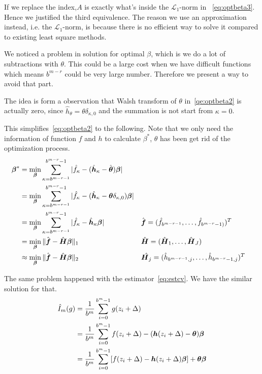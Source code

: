 If we replace the index,$A$ is exactly what's inside the $\mathcal{L}_1$-norm in ~\eqref{eq:optbeta3}. 
Hence we justified the third equivalence. The reason we use an approximation instead, i.e. the $\mathcal{L}_1$-norm, is because there is no efficient way to solve it compared to existing least square methods.


We noticed a problem in solution for optimal $\beta$, which is we do a lot of subtractions with $\theta$. This could be a large cost when we have difficult functions which means $b^{m-r}$ could be very large number. Therefore we present a way to avoid that part.

The idea is form a observation that Walsh transform of $\theta$ in~\eqref{qe:optbeta2} is actually zero, since $\hat{h}_\theta= \theta\delta_{\kappa,0}$ and the summation is not start from $\kappa=0$.

This simplifies~\eqref{eq:optbeta2} to the following. Note that we only need the information of function $f$ and $h$ to calculate $\beta^*$, $\theta$ has been get rid of the optimization process.
\begin{align}
    \boldsymbol{\beta}^*
    \label{eq:optbetanew}
    &=\min_{\boldsymbol{\beta}}\sum_{\kappa=b^{m-r-1}}^{b^{m-r}-1}|\hat{f}_\kappa
    -(\hat{\boldsymbol{h}}_\kappa - \hat{\boldsymbol{\theta}})\boldsymbol{\boldsymbol{\beta}}|\\
    &=\min_{\boldsymbol{\beta}}\sum_{\kappa=b^{m-r-1}}^{b^{m-r}-1}|\hat{f}_\kappa
    -(\hat{\boldsymbol{h}}_\kappa - \boldsymbol{\theta}\delta_{\kappa,0})\boldsymbol{\boldsymbol{\beta}}| \notag \\
    &=\min_{\boldsymbol{\beta}}\sum_{\kappa=b^{m-r-1}}^{b^{m-r}-1}|\hat{f}_\kappa
    -\hat{\boldsymbol{h}}_\kappa \boldsymbol{\boldsymbol{\beta}}|
    && \hat{\boldsymbol{f}}= (\hat{f}_{b^{m-r-1}},\dots,\hat{f}_{b^{m-r}-1)})^T \notag\\
    &=\min_{\boldsymbol{\beta}}\|\hat{\boldsymbol{f}}-\hat{\boldsymbol{H}}\boldsymbol{\beta}\|_1
    && \hat{\boldsymbol{H}}= (\hat{\boldsymbol{H}}_1, \dots, \hat{\boldsymbol{H}}_J)\notag \\
    &\approx\min_{\boldsymbol{\beta}}\|\hat{\boldsymbol{f}}-\hat{\boldsymbol{H}}\boldsymbol{\beta}\|_2
    &&\hat{\boldsymbol{H}_j}=(\hat{h}_{b^{m-r-1},j},\dots, \hat{h}_{b^{m-r}-1,j})^T \notag
\end{align}

The same problem happened with the estimator~\eqref{eq:estcv}. We have the similar solution for that.
\begin{align}
    \notag
    \hat{I}_m({g})
    & = \frac{1}{b^m}\sum_{i=0}^{b^m-1}g(z_i+\Delta)\\
    \notag
    & = \frac{1}{b^m}\sum_{i=0}^{b^m-1}f(z_i+\Delta)-(\boldsymbol{h}(z_i+\Delta)-\boldsymbol{\theta})\boldsymbol{\beta}\\
    \label{eq:estcvnew}
    & = \frac{1}{b^m}\sum_{i=0}^{b^m-1}[f(z_i+\Delta)-\boldsymbol{h}(z_i+\Delta)\boldsymbol{\beta}]+\boldsymbol{\theta}\boldsymbol{\beta}
\end{align}

